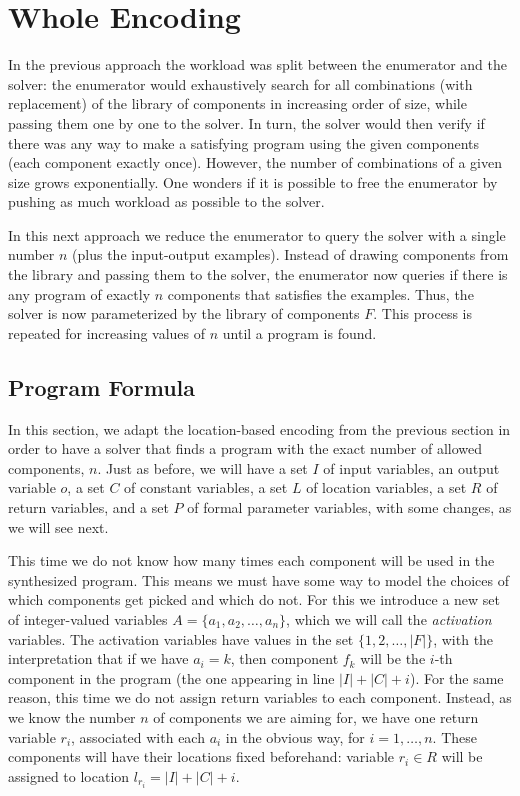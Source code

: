 \section{Whole Encoding}
\label{sec:whole-encoding}

In the previous approach the workload was split between the enumerator and the
solver: the enumerator would exhaustively search for all combinations (with
replacement) of the library of components in increasing order of size, while
passing them one by one to the solver. In turn, the solver would then verify if
there was any way to make a satisfying program using the given components (each
component exactly once). However, the number of combinations of a given size
grows exponentially. One wonders if it is possible to free the enumerator by
pushing as much workload as possible to the solver.

In this next approach we reduce the enumerator to query the solver with a single
number $n$ (plus the input-output examples). Instead of drawing components from the
library and passing them to the solver, the enumerator now queries if there is 
any program of exactly $n$ components that satisfies the examples. Thus, the
solver is now parameterized by the library of components $F$. This process is
repeated for increasing values of $n$ until a program is found.

\subsection{Program Formula}
\label{sec:program-formula-whole}

In this section, we adapt the location-based encoding from the previous section
in order to have a solver that finds a program with the exact number of allowed
components, $n$.
Just as before, we will have a set $I$ of input variables, an output variable
$o$, a set $C$ of constant variables, a set $L$ of location variables, a set $R$
of return variables, and a set $P$ of formal parameter variables, with some
changes, as we will see next.

This time we do not know how many times each component will be used in the
synthesized program.
This means we must have some way to model the choices of which components get
picked and which do not.
For this we introduce a new set of integer-valued variables $A = \{a_1, a_2,
\ldots, a_n\}$, which we will call the \textit{activation} variables.
The activation variables have values in the set $\{1, 2, \ldots, |F|\}$, with
the interpretation that if we have $a_i = k$, then component $f_k$ will be the
$i$-th component in the program (the one appearing in line $|I| + |C| + i$).
For the same reason, this time we do not assign return variables to each
component.
Instead, as we know the number $n$ of components we are aiming for, we have one
return variable $r_i$, associated with each $a_i$ in the obvious way, for
$i = 1, \ldots, n$.
These components will have their locations fixed beforehand: variable $r_i \in
R$ will be assigned to location $l_{r_i} = |I| + |C| + i$.

